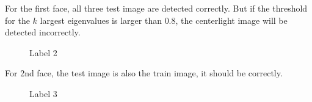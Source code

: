 \documentclass[letterpaper]{polythesis}
\begin{document}
For the first face, all three test image are detected correctly. But if the threshold
for the $k$ largest eigenvalues is larger than $0.8$, the centerlight image will
be detected incorrectly.

\newpage

\begin{figure}[htbp]
  \centering
  \caption{Label 2}
  \label{fig:result 2.1} %
\end{figure}

For 2nd face, the test image is also the train image, it should be correctly.

\begin{figure}[htbp]
  \centering
  \caption{Label 3}
  \label{fig:result 3.1} %
\end{figure}
\end{document}
